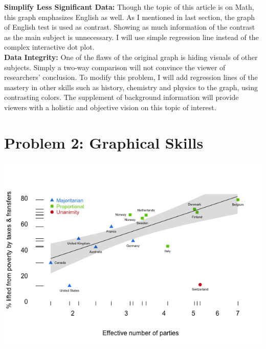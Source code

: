 \documentclass[11pt,letterpaper]{article}
\begin{document}
\noindent \textbf{Simplify Less Significant Data:} Though the topic of this article is on Math, this graph emphasizes English as well. As I mentioned in last section, the graph of English test is used as contrast. Showing as much information of the contrast as the main subject is unnecessary. I will use simple regression line instead of the complex interactive dot plot. \\

\noindent \textbf{Data Integrity:} One of the flaws of the original graph is hiding visuals of other subjects. Simply a two-way comparison will not convince the viewer of researchers' conclusion. To modify this problem, I will add regression lines of the mastery in other skills such as history, chemistry and physics to the graph, using contrasting colors. The supplement of background information will provide viewers with a holistic and objective vision on this topic of interest. 

\section*{Problem 2: Graphical Skills}
\includegraphics[scale=0.8]{problem2.png}
\end{document}
